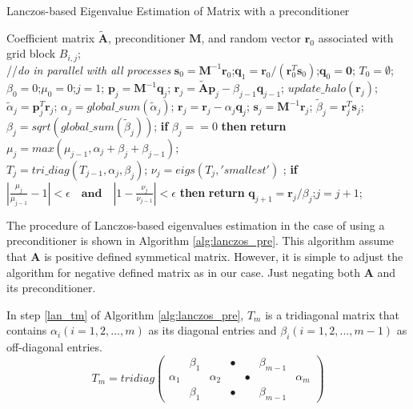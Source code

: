\documentclass{sig-alternate}
\begin{document}
\begin{algorithm}[h]
\caption{Lanczos-based Eigenvalue Estimation of Matrix with a preconditioner}
\label{alg:lanczos_pre}
\begin{algorithmic}[1]
\REQUIRE Coefficient matrix $\tilde{\textbf{A}}$, preconditioner $\textbf{M}$, and random vector $\textbf{r}_0$ associated with grid block $B_{i,j}$; \\
 //\qquad    \textit{do in parallel with all processes}
\STATE $\textbf{s}_0=\textbf{M}^{-1}\textbf{r}_0$;\quad $\textbf{q}_1 = \textbf{r}_0/({\textbf{r}_0^T\textbf{s}_0})$;\quad $\textbf{q}_0=\textbf{0}$;
\STATE $T_0=\emptyset$;\quad $\beta_0 =0$;\quad  $\mu_0 =0$;\quad $j=1$;
\STATE $\textbf{p}_j = \textbf{M}^{-1}\textbf{q}_j$; \quad $\textbf{r}_j=\tilde{\textbf{A}}\textbf{p}_j-\beta_{j-1}\textbf{q}_{j-1}$;
\STATE $update\_halo(\textbf{r}_j)$;
\STATE $\tilde{\alpha}_j =\textbf{p}_j^T\textbf{r}_j$; \quad $\alpha_j=global\_sum(\tilde{\alpha}_j)$;
\STATE $\textbf{r}_j=\textbf{r}_j-\alpha_{j}\textbf{q}_{j}$; \quad $\textbf{s}_j = \textbf{M}^{-1}\textbf{r}_j$; 
\STATE $\tilde{\beta}_j = \textbf{r}_j^T\textbf{s}_j$; \quad $\beta_j=sqrt(global\_sum(\tilde{\beta}_j))$;
\STATE \textbf{if} $\beta_j == 0$ \textbf{then} \textbf{return}
\STATE $\mu_j = max(\mu_{j-1},\alpha_j+\beta_j+\beta_{j-1})$; \label{lan_gersh}\\
\STATE $T_j=tri\_diag(T_{j-1},\alpha_j,\beta_j)$; \label{lan_tm}
\STATE $\nu_j = eigs(T_j,'smallest')$ ; \label{lan_nu}
\STATE \textbf{if} $|\frac{\mu_j}{\mu_{j-1}} -1 |< \epsilon\quad\textbf{and}\quad|1- \frac{\nu_j}{\nu_{j-1}}|< \epsilon$ \textbf{then} \textbf{return}
\STATE $\textbf{q}_{j+1}= \textbf{r}_j/\beta_j$;\quad $j=j+1$;
\ENDWHILE
\end{algorithmic}
\end{algorithm}

The procedure of Lanczos-based eigenvalues estimation in the case of using a preconditioner is shown in Algorithm \ref{alg:lanczos_pre}. This algorithm assume that $\textbf{A}$ is positive defined symmetical matrix.  However, it is simple to adjust the algorithm for negative defined matrix as in our case. Just negating both $\textbf{A}$ and its preconditioner. 

In step \ref{lan_tm} of Algorithm \ref{alg:lanczos_pre}, $T_m$ is a tridiagonal matrix that contains $\alpha_i (i=1,2,...,m)$ as its diagonal entries and $\beta_i (i=1,2,...,m-1)$ as off-diagonal entries.
\[ T_{m} = tridiag\left(\begin{array}{ccccccc}
&\beta_1 && \bullet & &\beta_{m-1}&    \\
\alpha_1 & &\alpha_2 && \bullet &&\alpha_{m}\\
&\beta_1 && \bullet & & \beta_{m-1}&
\end{array} \right)\]
\end{document}
